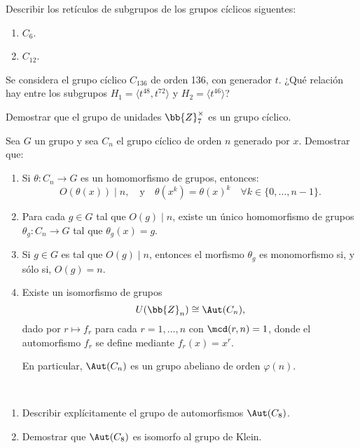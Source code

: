 \begin{ejercicio}\label{ej:3.14}
    Describir los retículos de subgrupos de los grupos cíclicos siguentes:
    \begin{enumerate}
        \item $C_6$.
        \item $C_{12}$.
    \end{enumerate}
\end{ejercicio}

\begin{ejercicio}\label{ej:3.15}
    Se considera el grupo cíclico $C_{136}$ de orden 136, con generador $t$. ¿Qué relación hay entre los subgrupos $H_1 = \langle t^{48}, t^{72} \rangle$ y $H_2 = \langle t^{46} \rangle$?
\end{ejercicio}

\begin{ejercicio}\label{ej:3.16}
    Demostrar que el grupo de unidades $\bb{Z}_7^\times$ es un grupo cíclico.
\end{ejercicio}

\begin{ejercicio}\label{ej:3.17}
    Sea $G$ un grupo y sea $C_n$ el grupo cíclico de orden $n$ generado por $x$. Demostrar que:
    \begin{enumerate}
        \item Si $\theta : C_n \to G$ es un homomorfismo de grupos, entonces:
        \begin{equation*}
            O(\theta(x))\mid n, \quad \text{y} \quad \theta(x^k) = \theta(x)^k \quad \forall k \in \{0, \ldots, n - 1\}.
        \end{equation*}

        \item Para cada $g \in G$ tal que $O(g) \mid n$, existe un único homomorfismo de grupos $\theta_g : C_n \to G$ tal que $\theta_g(x) = g$.
        
        \item Si $g \in G$ es tal que $O(g) \mid n$, entonces el morfismo $\theta_g$ es monomorfismo si, y sólo si, $O(g) = n$.
        
        \item Existe un isomorfismo de grupos
        \begin{equation*}
            U(\bb{Z}_n) \cong \Aut(C_n),
        \end{equation*}
        dado por $r \mapsto f_r$ para cada $r = 1, \ldots, n$ con $\mcd(r, n) = 1$, donde el automorfismo $f_r$ se define mediante $f_r(x) = x^r$.

        En particular, $\Aut(C_n)$ es un grupo abeliano de orden $\varphi(n)$.
    \end{enumerate}
\end{ejercicio}

\begin{ejercicio}\label{ej:3.18}~
    \begin{enumerate}
        \item Describir explícitamente el grupo de automorfismos $\Aut(C_8)$.
        \item Demostrar que $\Aut(C_8)$ es isomorfo al grupo de Klein.
    \end{enumerate}
\end{ejercicio}